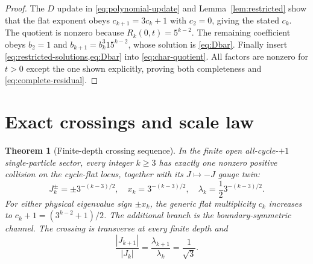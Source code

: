 \documentclass[11pt]{article}
\newtheorem{theorem}{Theorem}
\theoremstyle{remark}
\begin{document}
\begin{proof}
The $D$ update in \cref{eq:polynomial-update} and
Lemma~\ref{lem:restricted} show that the flat exponent obeys
$c_{k+1}=3c_k+1$ with $c_2=0$, giving the stated $c_k$.  The quotient is
nonzero because $R_k(0,t)=5^{k-2}$.  The remaining coefficient obeys
$b_2=1$ and $b_{k+1}=b_k^3 15^{k-2}$, whose solution is
\cref{eq:Dbar}.  Finally insert \cref{eq:restricted-solutions,eq:Dbar} into
\cref{eq:char-quotient}.  All factors are nonzero for $t>0$ except the one
shown explicitly, proving both completeness and \cref{eq:complete-residual}.
\end{proof}

\section{Exact crossings and scale law}
\label{sec:crossings}

\begin{theorem}[Finite-depth crossing sequence]
\label{thm:crossing}
In the finite open all-cycle-$+1$ single-particle sector, every integer
$k\geq3$ has exactly one nonzero positive collision on the cycle-flat locus,
together with its $J\mapsto-J$ gauge twin:
\begin{equation}
 \boxed{
 J_k^\pm=\pm3^{-(k-3)/2},\quad
 x_k=3^{-(k-3)/2},\quad
 \lambda_k=\frac12 3^{-(k-3)/2}.}
 \label{eq:crossing-sequence}
\end{equation}
For either physical eigenvalue sign $\pm x_k$, the generic flat multiplicity
$c_k$ increases to $c_k+1=(3^{k-2}+1)/2$.  The additional branch is the
boundary-symmetric channel.  The crossing is transverse at every finite
depth and
\begin{equation}
 \frac{|J_{k+1}|}{|J_k|}
 =\frac{\lambda_{k+1}}{\lambda_k}=\frac{1}{\sqrt3}.
 \label{eq:scale-ratio}
\end{equation}
\end{theorem}
\end{document}
